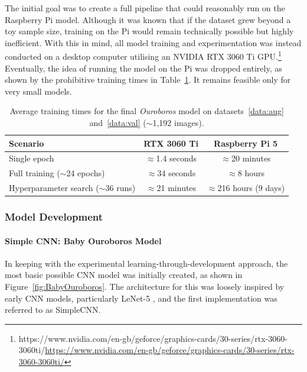             The initial goal was to create a full pipeline that could reasonably run on the Raspberry Pi model. Although it was known that if the dataset grew beyond a toy sample size, training on the Pi would remain technically possible but highly inefficient. With this in mind, all model training and experimentation was instead conducted on a desktop computer utilising an NVIDIA RTX 3060 Ti GPU.\footnote{https://www.nvidia.com/en-gb/geforce/graphics-cards/30-series/rtx-3060-3060ti/\url{https://www.nvidia.com/en-gb/geforce/graphics-cards/30-series/rtx-3060-3060ti/}} Eventually, the idea of running the model on the Pi was dropped entirely, as shown by the prohibitive training times in Table~\ref{tab:trainingTimes}. It remains feasible only for very small models.
    
            \begin{table}[H]
                \centering
                \begin{tabular}{lcc}
                    \toprule
                    \textbf{Scenario} & \textbf{RTX 3060 Ti} & \textbf{Raspberry Pi 5} \\
                    \midrule
                    Single epoch        & $\approx$1.4 seconds     & $\approx$20 minutes \\
                    Full training ($\sim$24 epochs) & $\approx$34 seconds     & $\approx$8 hours \\
                    Hyperparameter search ($\sim$36 runs) & $\approx$21 minutes     & $\approx$216 hours (9 days) \\
                    \bottomrule
                \end{tabular}
                \caption{Average training times for the final \textit{Ouroboros} model on datasets~\ref{data:aug} and~\ref{data:val} ($\sim$1,192 images).}
                \label{tab:trainingTimes}
            \end{table}
    
            \subsubsection{Model Development}
            
            \paragraph{Simple CNN: Baby Ouroboros Model}
    
                In keeping with the experimental learning-through-development approach, the most basic possible CNN model was initially created, as shown in Figure~\ref{fig:BabyOuroboros}. The architecture for this was loosely inspired by early CNN models, particularly LeNet-5 \cite{726791}, and the first implementation was referred to as SimpleCNN.
    
